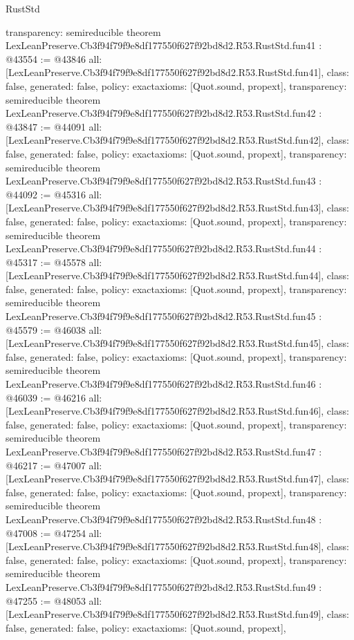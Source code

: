 \begin{lexlean}{RustStd}
\begin{coremodule}
{  transparency: semireducible
}
theorem LexLeanPreserve.Cb3f94f79f9e8df177550f627f92bd8d2.R53.RustStd.fun41 : @43554 := @43846 {
  all: [LexLeanPreserve.Cb3f94f79f9e8df177550f627f92bd8d2.R53.RustStd.fun41],
  class: false,
  generated: false,
  policy: exact{axioms: [Quot.sound, propext]},
  transparency: semireducible
}
theorem LexLeanPreserve.Cb3f94f79f9e8df177550f627f92bd8d2.R53.RustStd.fun42 : @43847 := @44091 {
  all: [LexLeanPreserve.Cb3f94f79f9e8df177550f627f92bd8d2.R53.RustStd.fun42],
  class: false,
  generated: false,
  policy: exact{axioms: [Quot.sound, propext]},
  transparency: semireducible
}
theorem LexLeanPreserve.Cb3f94f79f9e8df177550f627f92bd8d2.R53.RustStd.fun43 : @44092 := @45316 {
  all: [LexLeanPreserve.Cb3f94f79f9e8df177550f627f92bd8d2.R53.RustStd.fun43],
  class: false,
  generated: false,
  policy: exact{axioms: [Quot.sound, propext]},
  transparency: semireducible
}
theorem LexLeanPreserve.Cb3f94f79f9e8df177550f627f92bd8d2.R53.RustStd.fun44 : @45317 := @45578 {
  all: [LexLeanPreserve.Cb3f94f79f9e8df177550f627f92bd8d2.R53.RustStd.fun44],
  class: false,
  generated: false,
  policy: exact{axioms: [Quot.sound, propext]},
  transparency: semireducible
}
theorem LexLeanPreserve.Cb3f94f79f9e8df177550f627f92bd8d2.R53.RustStd.fun45 : @45579 := @46038 {
  all: [LexLeanPreserve.Cb3f94f79f9e8df177550f627f92bd8d2.R53.RustStd.fun45],
  class: false,
  generated: false,
  policy: exact{axioms: [Quot.sound, propext]},
  transparency: semireducible
}
theorem LexLeanPreserve.Cb3f94f79f9e8df177550f627f92bd8d2.R53.RustStd.fun46 : @46039 := @46216 {
  all: [LexLeanPreserve.Cb3f94f79f9e8df177550f627f92bd8d2.R53.RustStd.fun46],
  class: false,
  generated: false,
  policy: exact{axioms: [Quot.sound, propext]},
  transparency: semireducible
}
theorem LexLeanPreserve.Cb3f94f79f9e8df177550f627f92bd8d2.R53.RustStd.fun47 : @46217 := @47007 {
  all: [LexLeanPreserve.Cb3f94f79f9e8df177550f627f92bd8d2.R53.RustStd.fun47],
  class: false,
  generated: false,
  policy: exact{axioms: [Quot.sound, propext]},
  transparency: semireducible
}
theorem LexLeanPreserve.Cb3f94f79f9e8df177550f627f92bd8d2.R53.RustStd.fun48 : @47008 := @47254 {
  all: [LexLeanPreserve.Cb3f94f79f9e8df177550f627f92bd8d2.R53.RustStd.fun48],
  class: false,
  generated: false,
  policy: exact{axioms: [Quot.sound, propext]},
  transparency: semireducible
}
theorem LexLeanPreserve.Cb3f94f79f9e8df177550f627f92bd8d2.R53.RustStd.fun49 : @47255 := @48053 {
  all: [LexLeanPreserve.Cb3f94f79f9e8df177550f627f92bd8d2.R53.RustStd.fun49],
  class: false,
  generated: false,
  policy: exact{axioms: [Quot.sound, propext]},
}
\end{coremodule}
\end{lexlean}
